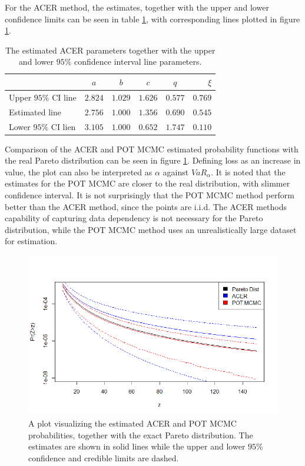 For the ACER method, the estimates, together with the upper and lower confidence limits can be seen in table \ref{table:paretoacerest}, with corresponding lines plotted in figure \ref{fig:paretoacermcmc}.
\begin{table}[h]
\centering
\begin{tabular}{ l c c c c r}
    & $a$ & $b$ &$c$ & $q$ & $\xi$  \\
  \hline
  Upper $95\%$ CI line& $2.824$ & $1.029$ & $1.626$ & $0.577$ & $0.769$ \\
  Estimated line& $2.756$ & $1.000$&$1.356$&$0.690$&$0.545$\\
  Lower $95\%$ CI lien & $3.105$ & $1.000$&$0.652$&$1.747$&$0.110$\\
\end{tabular}
\caption{The estimated ACER parameters together with the upper and lower $95\%$ confidence interval line parameters. }
\label{table:paretoacerest}
\end{table}

Comparison of the ACER and POT MCMC estimated probability functions with the real Pareto distribution can be seen in figure \ref{fig:paretoacermcmc}. Defining loss as an increase in value, the plot can also be interpreted as $\alpha$ against $VaR_\alpha$.
It is noted that the estimates for the POT MCMC are closer to the real distribution, with slimmer confidence interval. It is not surprisingly that the POT MCMC method perform better than the ACER method, since the points are i.i.d. The ACER methods capability of capturing data dependency is not necessary for the Pareto distribution, while the POT MCMC method uses an unrealistically large dataset for estimation.
\begin{figure}
  \centering
    \includegraphics[width=1\textwidth]{fig/result/paretoacermcmc.png}
  \caption{A plot visualizing the estimated ACER and POT MCMC probabilities, together with the exact Pareto distribution. The estimates are shown in solid lines while the upper and lower $95\%$ confidence and credible limits are dashed.}
  \label{fig:paretoacermcmc}
\end{figure}

